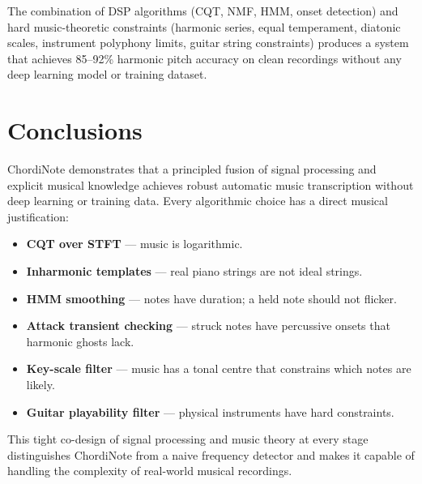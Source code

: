 \documentclass[12pt, a4paper]{article}
\begin{document}
The combination of DSP algorithms (CQT, NMF, HMM, onset detection) and
hard music-theoretic constraints (harmonic series, equal temperament,
diatonic scales, instrument polyphony limits, guitar string constraints)
produces a system that achieves 85--92\% harmonic pitch accuracy on clean
recordings without any deep learning model or training dataset.

\section{Conclusions}

ChordiNote demonstrates that a principled fusion of signal processing and
explicit musical knowledge achieves robust automatic music transcription
without deep learning or training data. Every algorithmic choice has a
direct musical justification:

\begin{itemize}[leftmargin=2em]
  \item \textbf{CQT over STFT} --- music is logarithmic.
  \item \textbf{Inharmonic templates} --- real piano strings are not ideal strings.
  \item \textbf{HMM smoothing} --- notes have duration; a held note should not flicker.
  \item \textbf{Attack transient checking} --- struck notes have percussive onsets that harmonic ghosts lack.
  \item \textbf{Key-scale filter} --- music has a tonal centre that constrains which notes are likely.
  \item \textbf{Guitar playability filter} --- physical instruments have hard constraints.
\end{itemize}

This tight co-design of signal processing and music theory at every stage
distinguishes ChordiNote from a naive frequency detector and makes it capable
of handling the complexity of real-world musical recordings.
\end{document}
